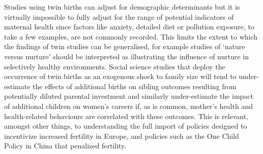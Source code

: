 \documentclass{nature}
\begin{document}
\begin{linenumbers}
Studies using twin births can adjust for demographic determinants but it is virtually impossible to fully adjust for the range of potential indicators of maternal health since factors like anxiety, detailed diet or pollution exposure, to take a few examples, are not commonly recorded. This limits the extent to which the findings of twin studies can be generalised, for example studies of `nature versus nurture' should be interpreted as illustrating the influence of nurture in selectively healthy environments. Social science studies that deploy the occurrence of twin births as an exogenous shock to family size will tend to under-estimate the effects of additional births on sibling outcomes resulting from potentially diluted parental investment and similarly under-estimate the impact of additional children on women's careers if, as is common, mother's health and health-related behaviours are correlated with these outcomes. This is relevant, amongst other things, to understanding the full import of policies designed to incentivize increased fertility in Europe, and policies such as the One Child Policy in China that penalized fertility.




\clearpage
\thispagestyle{empty}

\clearpage


\end{linenumbers}
\end{document}
